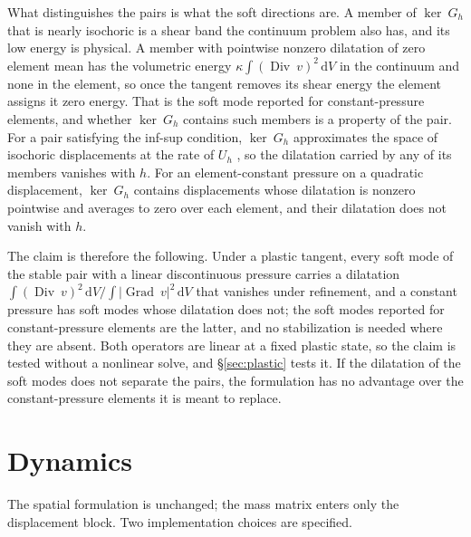 \documentclass[11pt]{article}
\newcommand{\Grad}{\operatorname{Grad}}
\newcommand{\Div}{\operatorname{Div}}
\newcommand{\diff}{\,\mathrm{d}}
\theoremstyle{definition}
\theoremstyle{plain}
\begin{document}
What distinguishes the pairs is what the soft directions are. A member of
$\ker ~G_h$ that is nearly isochoric is a shear band the continuum problem
also has, and its low energy is physical. A member with pointwise nonzero
dilatation of zero element mean has the volumetric energy
$\kappa \int (\Div ~v)^2 \diff V$ in the continuum and none in the element,
so once the tangent removes its shear energy the element assigns it zero
energy. That is the soft
mode reported for constant-pressure elements, and whether $\ker ~G_h$
contains such members is a property of the pair. For a pair satisfying the
inf-sup condition, $\ker ~G_h$ approximates the space of isochoric
displacements at the rate of $U_h$ \citep[Prop.~5.1.3]{BoffiBrezziFortin:2013},
so the dilatation carried by any of its members vanishes with $h$. For an
element-constant pressure on a quadratic displacement, $\ker ~G_h$ contains
displacements whose dilatation is nonzero pointwise and averages to zero over
each element, and their dilatation does not vanish with $h$.

The claim is therefore the following. Under a plastic tangent, every
soft mode of the stable pair with a linear discontinuous pressure carries a
dilatation $\int (\Div ~v)^2 \diff V / \int \lvert\Grad ~v\rvert^2 \diff V$
that vanishes under refinement, and a constant pressure has soft modes whose
dilatation does not; the soft modes reported for constant-pressure elements
are the latter, and no stabilization is needed where they are absent. Both operators are linear at a fixed plastic state,
so the claim is tested without a nonlinear solve, and \S\ref{sec:plastic}
tests it. If the dilatation of the soft modes does not separate the pairs,
the formulation has no advantage over the constant-pressure elements it is
meant to replace.

\section{Dynamics}
\label{sec:dynamics}

The spatial formulation is unchanged; the mass matrix enters only the
displacement block. Two implementation choices are specified.
\end{document}
